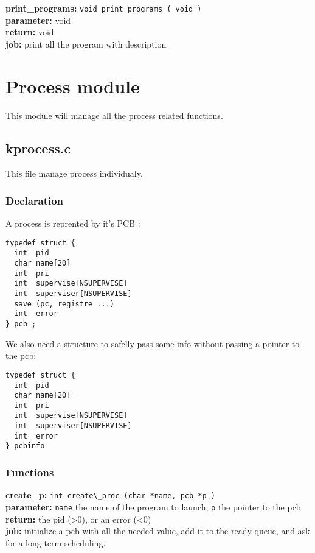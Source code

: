 \noindent\textbf{print\_programs:} \verb+void print_programs ( void )+\\
\textbf{parameter:} void\\
\textbf{return:} void\\
\textbf{job:} print all the program with description\\

\section{Process module}

This module will manage all the process related functions.

\subsection{kprocess.c}

This file manage process individualy.

\subsubsection{Declaration}

A process is reprented by it's PCB :
\begin{verbatim}
typedef struct {
  int  pid
  char name[20]
  int  pri
  int  supervise[NSUPERVISE]
  int  superviser[NSUPERVISE]
  save (pc, registre ...)
  int  error
} pcb ;
\end{verbatim}

We also need a structure to safelly pass some info without passing a pointer to the pcb:
\begin{verbatim}
typedef struct {
  int  pid
  char name[20]
  int  pri
  int  supervise[NSUPERVISE]
  int  superviser[NSUPERVISE]
  int  error
} pcbinfo
\end{verbatim}

\subsubsection{Functions}

\noindent\textbf{create\_p:} \verb+int create\_proc (char *name, pcb *p )+\\
\textbf{parameter:} \verb+name+ the name of the program to launch, \verb+p+ the pointer to the pcb\\
\textbf{return:} the pid (>0), or an error (<0)\\
\textbf{job:} initialize a pcb with all the needed value, add it to the ready queue, and ask for a long term scheduling.\\

